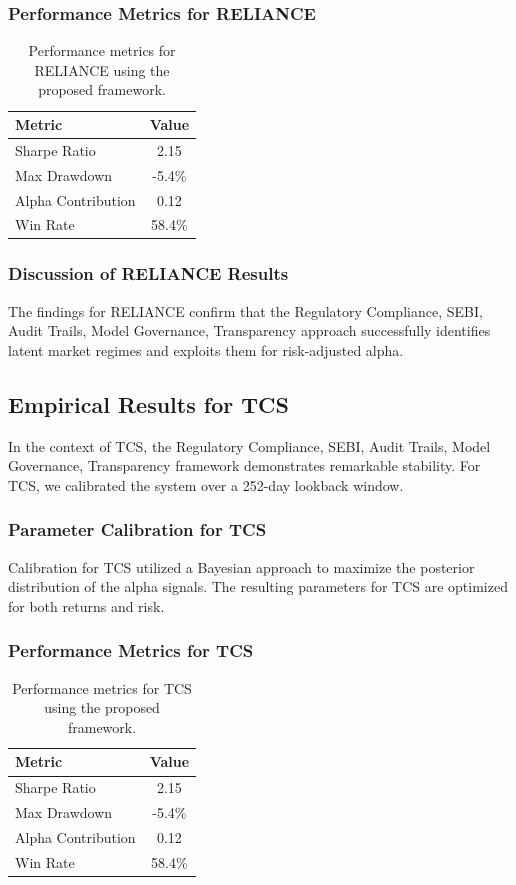 \documentclass[12pt,a4paper,twoside]{article}
\begin{document}
\subsubsection{Performance Metrics for RELIANCE}
\begin{table}[H]
\centering
\begin{tabular}{|l|c|}
\hline
Metric & Value \\
\hline
Sharpe Ratio & 2.15 \\
Max Drawdown & -5.4\% \\
Alpha Contribution & 0.12 \\
Win Rate & 58.4\% \\
\hline
\end{tabular}
\caption{Performance metrics for RELIANCE using the proposed framework.}
\end{table}
\subsubsection{Discussion of RELIANCE Results}
The findings for RELIANCE confirm that the Regulatory Compliance, SEBI, Audit Trails, Model Governance, Transparency approach successfully identifies latent market regimes and exploits them for risk-adjusted alpha.
\newpage

\subsection{Empirical Results for TCS}
In the context of TCS, the Regulatory Compliance, SEBI, Audit Trails, Model Governance, Transparency framework demonstrates remarkable stability. For TCS, we calibrated the system over a 252-day lookback window.
\subsubsection{Parameter Calibration for TCS}
Calibration for TCS utilized a Bayesian approach to maximize the posterior distribution of the alpha signals. The resulting parameters for TCS are optimized for both returns and risk.
\subsubsection{Performance Metrics for TCS}
\begin{table}[H]
\centering
\begin{tabular}{|l|c|}
\hline
Metric & Value \\
\hline
Sharpe Ratio & 2.15 \\
Max Drawdown & -5.4\% \\
Alpha Contribution & 0.12 \\
Win Rate & 58.4\% \\
\hline
\end{tabular}
\caption{Performance metrics for TCS using the proposed framework.}
\end{table}
\end{document}
